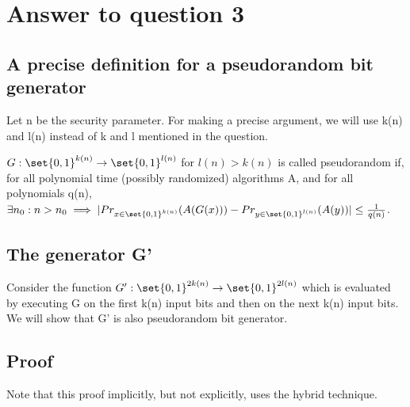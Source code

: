\documentclass[10pt]{article}
\begin{document}
% 
% 
% 
% 
% 

\section{Answer to question 3}
\subsection*{A precise definition for a pseudorandom bit generator}
Let n be the security parameter. For making a precise argument, we will use k(n) and l(n) instead of k and l mentioned in the question.

$G:\set{0, 1}^{k(n)} \to \set{0, 1}^{l(n)}$ for $l(n)>k(n)$ is called pseudorandom if, for all polynomial time (possibly randomized) algorithms A, and for all polynomials q(n), $\exists n_{0}: n>n_{0} \implies |Pr_{x \in \set{0, 1}^{k(n)}}(A(G(x))) - Pr_{y \in \set{0, 1}^{l(n)}}(A(y))| \leq \frac{1}{q(n)}$.

\subsection*{The generator G'}
Consider the function $G':\set{0, 1}^{2k(n)} \to \set{0, 1}^{2l(n)}$ which is evaluated by executing G on the first k(n) input bits and then on the next k(n) input bits. We will show that G' is also pseudorandom bit generator.

\subsection*{Proof}
Note that this proof implicitly, but not explicitly, uses the hybrid technique.
\end{document}
